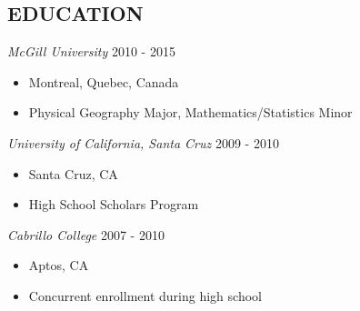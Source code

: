 \documentclass[margin]{res}
\begin{document}
\begin{resume}
 \vspace{-13pt}
\section{EDUCATION} %
\textit{McGill University} \hfill 2010 - 2015
\begin{itemize}
\item[] Montreal, Quebec, Canada  %
\hspace{-7pt}
\vspace{-5pt}\item[] Physical Geography Major, Mathematics/Statistics Minor
\end{itemize}


\vspace{-7pt}
\textit{University of California, Santa Cruz} \hfill 2009 - 2010
\begin{itemize}
\item[] Santa Cruz, CA
\vspace{-5pt}\item[] High School Scholars Program
 \end{itemize}

\vspace{-7pt}
\textit{Cabrillo College} \hfill 2007 - 2010
\begin{itemize}
\item[] Aptos, CA
\vspace{-5pt}\item[] Concurrent enrollment during high school
 \end{itemize}




\end{resume}
\end{document}
